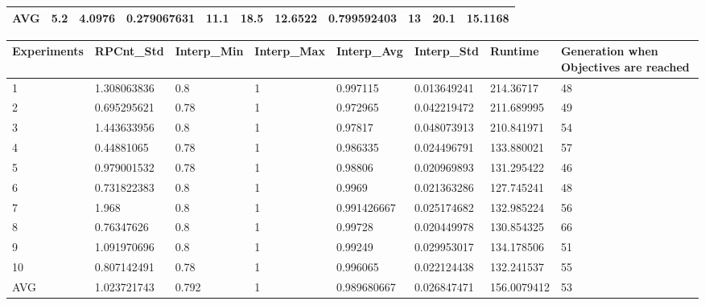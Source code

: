 \begin{table}[H]
\begin{adjustbox}{max width=380pt,keepaspectratio,angle=90}
\begin{tabular}{|l|l|l|l|l|l|l|l|l|l|l|}
					AVG         & 5.2          & 4.0976       & 0.279067631  & 11.1       & 18.5       & 12.6522    & 0.799592403 & 13         & 20.1       & 15.1168    \\ \hline
				\end{tabular}
			\end{adjustbox}
			\begin{adjustbox}{max width=340pt,keepaspectratio,angle=90}
				\begin{tabular}{|l|l|l|l|l|l|l|l|}
					\hline
					\rowcolor[HTML]{EFEFEF} 
					Experiments & RPCnt\_Std  & Interp\_Min & Interp\_Max & Interp\_Avg & Interp\_Std & Runtime     & Generation when Objectives are reached \\ \hline
					1           & 1.308063836 & 0.8         & 1           & 0.997115    & 0.013649241 & 214.36717   & 48                                     \\ \hline
					2           & 0.695295621 & 0.78        & 1           & 0.972965    & 0.042219472 & 211.689995  & 49                                     \\ \hline
					3           & 1.443633956 & 0.8         & 1           & 0.97817     & 0.048073913 & 210.841971  & 54                                     \\ \hline
					4           & 0.44881065  & 0.78        & 1           & 0.986335    & 0.024496791 & 133.880021  & 57                                     \\ \hline
					5           & 0.979001532 & 0.78        & 1           & 0.98806     & 0.020969893 & 131.295422  & 46                                     \\ \hline
					6           & 0.731822383 & 0.8         & 1           & 0.9969      & 0.021363286 & 127.745241  & 48                                     \\ \hline
					7           & 1.968       & 0.8         & 1           & 0.991426667 & 0.025174682 & 132.985224  & 56                                     \\ \hline
					8           & 0.76347626  & 0.8         & 1           & 0.99728     & 0.020449978 & 130.854325  & 66                                     \\ \hline
					9           & 1.091970696 & 0.8         & 1           & 0.99249     & 0.029953017 & 134.178506  & 51                                     \\ \hline
					10          & 0.807142491 & 0.78        & 1           & 0.996065    & 0.022124438 & 132.241537  & 55                                     \\ \hline
					AVG         & 1.023721743 & 0.792       & 1           & 0.989680667 & 0.026847471 & 156.0079412 & 53                                     \\ \hline
				\end{tabular}
			\end{adjustbox}	
		\end{table}
